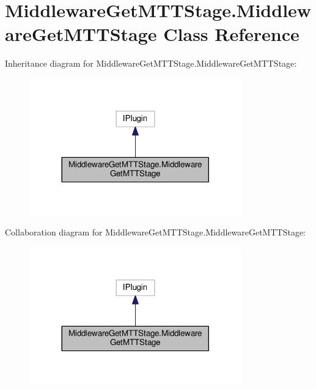 \hypertarget{classMiddlewareGetMTTStage_1_1MiddlewareGetMTTStage}{\section{Middleware\-Get\-M\-T\-T\-Stage.\-Middleware\-Get\-M\-T\-T\-Stage Class Reference}
\label{classMiddlewareGetMTTStage_1_1MiddlewareGetMTTStage}
}


Inheritance diagram for Middleware\-Get\-M\-T\-T\-Stage.\-Middleware\-Get\-M\-T\-T\-Stage\-:
\nopagebreak
\begin{figure}[H]
\begin{center}
\leavevmode
\includegraphics[width=260pt]{classMiddlewareGetMTTStage_1_1MiddlewareGetMTTStage__inherit__graph}
\end{center}
\end{figure}


Collaboration diagram for Middleware\-Get\-M\-T\-T\-Stage.\-Middleware\-Get\-M\-T\-T\-Stage\-:
\nopagebreak
\begin{figure}[H]
\begin{center}
\leavevmode
\includegraphics[width=260pt]{classMiddlewareGetMTTStage_1_1MiddlewareGetMTTStage__coll__graph}
\end{center}
\end{figure}
